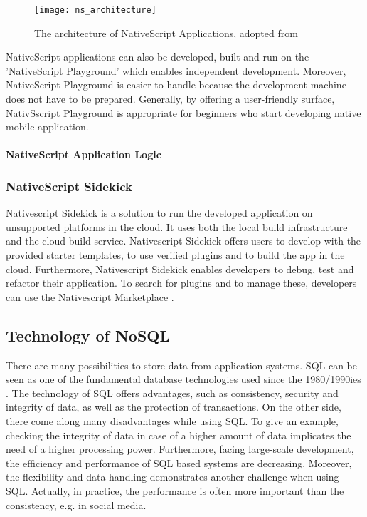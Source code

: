 \begin{figure}
\centering
\texttt{[image: ns\_architecture]} 
\caption{\label{fig:nsarchitecture}The architecture of NativeScript Applications, adopted from \cite{nsarchitecture}} 
\end{figure}

NativeScript applications can also be developed, built and run on the 'NativeScript Playground' \cite{nsplayground} which enables independent development. Moreover, NativeScript Playground is easier to handle because the development machine does not have to be prepared. Generally, by offering a user-friendly surface, NativSscript Playground is appropriate for beginners who start developing native mobile application.

\paragraph{NativeScript Application Logic}

\subsubsection{NativeScript Sidekick} \label{Native}

Nativescript Sidekick is a solution to run the developed application on unsupported platforms in the cloud. It uses both the local build infrastructure and the cloud build service. Nativescript Sidekick offers users to develop with the provided starter templates, to use verified plugins and to build the app in the cloud. Furthermore, Nativescript Sidekick enables developers to debug, test and refactor their application. 
To search for plugins and to manage these, developers can use the Nativescript Marketplace \cite{nsmarket}.

\subsection{Technology of NoSQL} \label{nosql}

There are many possibilities to store data from application systems. \ac{SQL} can be seen as one of the fundamental database technologies used since the 1980/1990ies \cite[p.137 ff.]{nosql_meier}. The technology of SQL offers advantages, such as consistency, security and integrity of data, as well as the protection of transactions. On the other side, there come along many disadvantages while using SQL. To give an example, checking the integrity of data in case of a higher amount of data implicates the need of a higher processing power. Furthermore, facing large-scale development, the efficiency and performance of SQL based systems are decreasing. Moreover, the flexibility and data handling demonstrates another challenge when using SQL. Actually, in practice, the performance is often more important than the consistency, e.g. in social media.    

